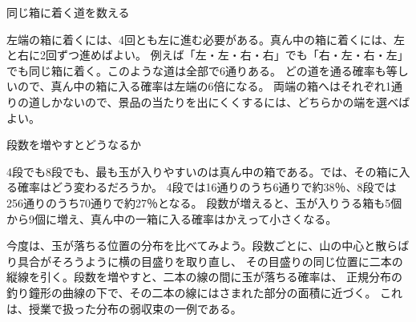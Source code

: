 \documentclass[a4paper,10pt,pdflatex,ja=standard,jafont=ipaex-type1,
  magstyle=real,scale=1]{bxjsarticle}
\newcommand{\columnheading}[1]{\par\vspace{5pt}
  {\fontsize{11pt}{15pt}\selectfont\sffamily\mdseries\color{accent}#1}\par\vspace{2pt}}
\begin{document}
\begin{center}
\end{center}

\columnheading{同じ箱に着く道を数える}
左端の箱に着くには、4回とも左に進む必要がある。真ん中の箱に着くには、左と右に2回ずつ進めばよい。
例えば「左・左・右・右」でも「右・左・右・左」でも同じ箱に着く。このような道は全部で6通りある。
どの道を通る確率も等しいので、真ん中の箱に入る確率は左端の6倍になる。
両端の箱へはそれぞれ1通りの道しかないので、景品の当たりを出にくくするには、どちらかの端を選べばよい。

\columnheading{段数を増やすとどうなるか}
4段でも8段でも、最も玉が入りやすいのは真ん中の箱である。では、その箱に入る確率はどう変わるだろうか。
4段では16通りのうち6通りで約38％、8段では256通りのうち70通りで約27％となる。
段数が増えると、玉が入りうる箱も5個から9個に増え、真ん中の一箱に入る確率はかえって小さくなる。

今度は、玉が落ちる位置の分布を比べてみよう。段数ごとに、山の中心と散らばり具合がそろうように横の目盛りを取り直し、
その目盛りの同じ位置に二本の縦線を引く。段数を増やすと、二本の線の間に玉が落ちる確率は、
正規分布の釣り鐘形の曲線の下で、その二本の線にはさまれた部分の面積に近づく。
これは、授業で扱った分布の弱収束の一例である。

\label{lastpage}
\end{document}
